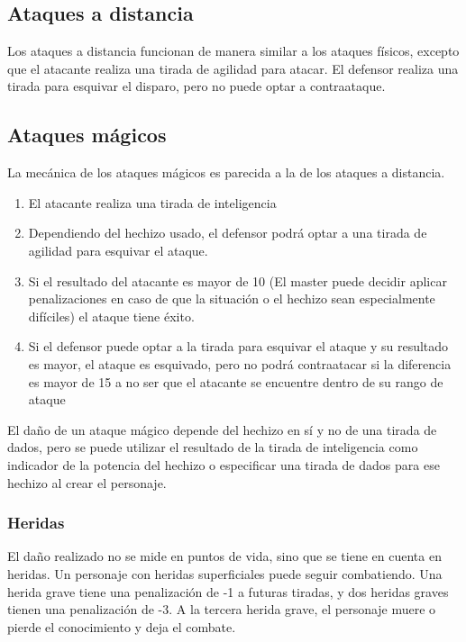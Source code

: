 \subsection{Ataques a distancia}

Los ataques a distancia funcionan de manera similar a los ataques físicos, excepto que el atacante realiza una tirada de agilidad para atacar. El defensor realiza una tirada para esquivar el disparo, pero no puede optar a contraataque. 

\subsection{Ataques mágicos}

La mecánica de los ataques mágicos es parecida a la de los ataques a distancia. 

\begin{enumerate}
\item El atacante realiza una tirada de inteligencia
\item Dependiendo del hechizo usado, el defensor podrá optar a una tirada de agilidad para esquivar el ataque.
\item Si el resultado del atacante es mayor de 10 (El master puede decidir aplicar penalizaciones en caso de que la situación o el hechizo sean especialmente difíciles) el ataque tiene éxito. 
\item Si el defensor puede optar a la tirada para esquivar el ataque y su resultado es mayor, el ataque es esquivado, pero no podrá contraatacar si la diferencia es mayor de 15 a no ser que el atacante se encuentre dentro de su rango de ataque
\end{enumerate}

\par 
El daño de un ataque mágico depende del hechizo en sí y no de una tirada de dados, pero se puede utilizar el resultado de la tirada de inteligencia como indicador de la potencia del hechizo o especificar una tirada de dados para ese hechizo al crear el personaje.

\subsubsection*{Heridas}

El daño realizado no se mide en puntos de vida, sino que se tiene en cuenta en heridas. Un personaje con heridas superficiales puede seguir combatiendo. Una herida grave tiene una penalización de -1 a futuras tiradas, y dos heridas graves tienen una penalización de -3. A la tercera herida grave, el personaje muere o pierde el conocimiento y deja el combate.

